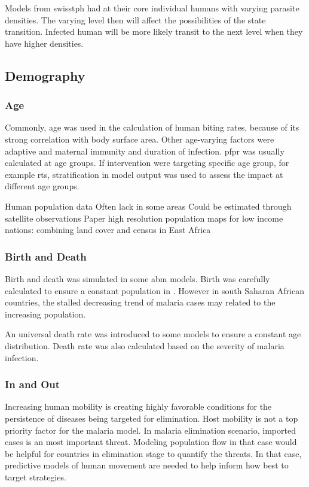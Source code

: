 \documentclass[a4paper, 12pt, twoside]{article}
\begin{document}
Models from \gls{swisstph} had at their core individual humans with varying parasite densities. The varying level then will affect the possibilities of the state transition. Infected human will be more likely transit to the next level when they have higher densities.

\subsection{Demography}

  \subsubsection{Age}
  Commonly, age was used in the calculation of human biting rates, because of its strong correlation with body surface area.
  Other age-varying factors were adaptive and maternal immunity and duration of infection.
  \gls{pfpr} was usually calculated at age groups.
  If intervention were targeting specific age group, for example \gls{rts}, stratification in model output was used to assess the impact at different age groups.

  
Human population data
Often lack in some areas
Could be estimated through satellite observations
Paper high resolution population maps for low income nations: combining land cover and census in East Africa

  \subsubsection{Birth and Death}
  Birth and death was simulated in some \gls{abm} models.
  Birth was carefully calculated to ensure a constant population in .
  However in south Saharan African countries, the stalled decreasing trend of malaria cases may related to the increasing population.

  An universal death rate was introduced to some models  to ensure a constant age distribution. Death rate was also calculated based on the severity of malaria infection.

  \subsubsection{In and Out}
  Increasing human mobility is creating highly favorable conditions for the persistence of diseases being targeted for elimination.
  Host mobility is not a top priority factor for the malaria model.
  In malaria elimination scenario, imported cases is an most important threat.
  Modeling population flow in that case would be helpful for countries in elimination stage to quantify the threats.
  In that case, predictive models of human movement are needed to help inform how best to target strategies.
\end{document}
